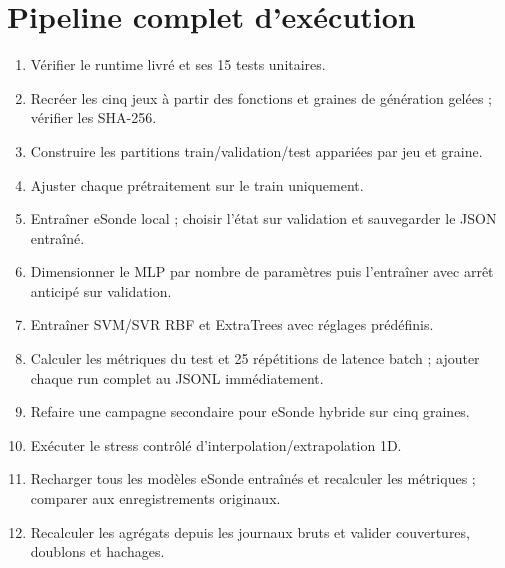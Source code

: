 \documentclass[11pt,a4paper]{article}
\begin{document}
\section{Pipeline complet d'exécution}
\begin{enumerate}
\item Vérifier le runtime livré et ses 15 tests unitaires.
\item Recréer les cinq jeux à partir des fonctions et graines de génération gelées ; vérifier les SHA-256.
\item Construire les partitions train/validation/test appariées par jeu et graine.
\item Ajuster chaque prétraitement sur le train uniquement.
\item Entraîner eSonde local ; choisir l'état sur validation et sauvegarder le JSON entraîné.
\item Dimensionner le MLP par nombre de paramètres puis l'entraîner avec arrêt anticipé sur validation.
\item Entraîner SVM/SVR RBF et ExtraTrees avec réglages prédéfinis.
\item Calculer les métriques du test et 25 répétitions de latence batch ; ajouter chaque run complet au JSONL immédiatement.
\item Refaire une campagne secondaire pour eSonde hybride sur cinq graines.
\item Exécuter le stress contrôlé d'interpolation/extrapolation 1D.
\item Recharger tous les modèles eSonde entraînés et recalculer les métriques ; comparer aux enregistrements originaux.
\item Recalculer les agrégats depuis les journaux bruts et valider couvertures, doublons et hachages.
\end{enumerate}
\end{document}
